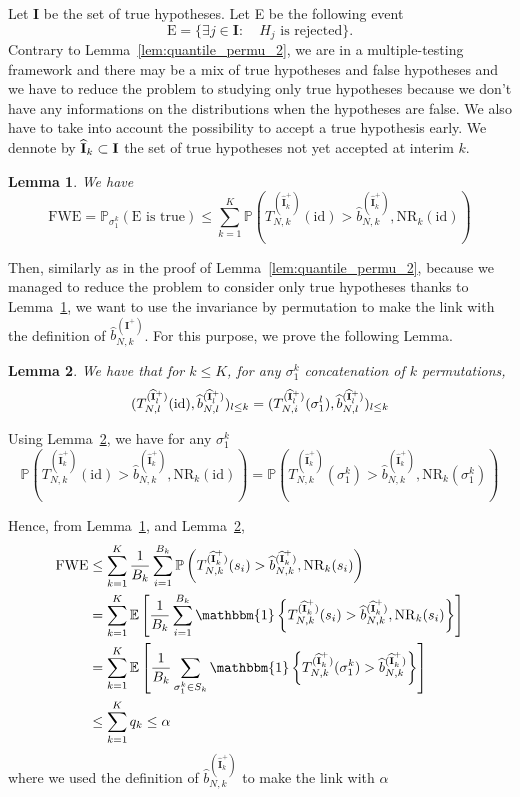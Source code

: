 \documentclass{article}
\theoremstyle{plain}
\newtheorem{Lemma}{Lemma}
\theoremstyle{remark}
\renewcommand{\P}{\mathbb{P}}
\newcommand{\E}{\mathbb{E}}
\newcommand{\1}{\mathbbm{1}}
\newcommand{\id}{\mathrm{id}}
\numberwithin{equation}{section}
\begin{document}
Let $\textbf{I}$ be the set of true hypotheses. Let E be the following event
$$\mathrm{E}= \{ \exists j \in \textbf{I}: \quad H_j \text{ is rejected}\}.$$
Contrary to Lemma~\ref{lem:quantile_permu_2}, we are in a multiple-testing framework and there may be a mix of true hypotheses and false hypotheses and we have to reduce the problem to studying only true hypotheses because we don't have any informations on the distributions when the hypotheses are false. We also have to take into account the possibility to accept a true hypothesis early. We dennote by $\widehat{\bf I}_k \subset \bf I$ the set of true hypotheses not yet accepted at interim $k$.
\begin{Lemma}\label{lem:multiple_test_FWE}
We have 
$$\mathrm{FWE} = \P_{\sigma_1^k}\left(\mathrm{E}\text{ is true} \right) \le \sum_{k=1}^K\P\left( T_{N,k}^{(\widehat{\textbf{I}}_k^+)}(\id) > \widehat{b}_{N,k}^{(\widehat{\textbf{I}}_k^+)}, \mathrm{NR}_k(\id)\right)  $$
\end{Lemma}
Then, similarly as in the proof of Lemma~\ref{lem:quantile_permu_2}, because we managed to reduce the problem to consider only true hypotheses thanks to Lemma~\ref{lem:multiple_test_FWE}, we want to use the invariance by permutation to make the link with the definition of $\widehat{b}_{N,k}^{(\textbf{I}^+)}$. For this purpose, we prove the following Lemma.


\begin{Lemma}\label{lem:invariance}
We have that for $k \le K$, for any ${\sigma_1^k}$ concatenation of $k$ permutations, 
$$(T_{N,l}^{(\widehat{\bf{I}}_l^+)}(\id),\widehat{b}_{N,l}^{(\widehat{\bf{I}}_l^+)})_{l\le k}=(T_{N,i}^{(\widehat{\bf{I}}_l^+)}(\sigma_1^l), \widehat{b}_{N,l}^{(\widehat{\bf{I}}_l^+)})_{l\le k}$$
\end{Lemma}
Using Lemma~\ref{lem:invariance}, we have for any ${\sigma_1^k}$
$$\P\left(T_{N,k}^{(\widehat{\textbf{I}}_k^+)}(\id) > \widehat{b}_{N,k}^{(\widehat{\textbf{I}}_k^+)}, \mathrm{NR}_k(\id ) \right) = \P\left(T_{N,k}^{(\widehat{\textbf{I}}_k^+)}({\sigma_1^k}) > \widehat{b}_{N,k}^{(\widehat{\textbf{I}}_k^+)}, \mathrm{NR}_k({\sigma_1^k}) \right)$$

Hence, from Lemma~\ref{lem:multiple_test_FWE}, and Lemma~\ref{lem:invariance},
\begin{align*}
\mathrm{FWE} &\le \sum_{k=1}^K\frac{1}{B_k}\sum_{i=1}^{B_k}\P\left(T_{N,k}^{(\widehat{\textbf{I}}_k^+)}(s_i) > \widehat{b}_{N,k}^{(\widehat{\textbf{I}}_k^+)}, \mathrm{NR}_k(s_i) \right)\\
&= \sum_{k=1}^K\E\left[\frac{1}{B_k}\sum_{i=1}^{B_k}\1\left\{ T_{N,k}^{(\widehat{\textbf{I}}_k^+)}(s_i) > \widehat{b}_{N,k}^{(\widehat{\textbf{I}}_k^+)}, \mathrm{NR}_k(s_i)\right\} \right]\\
&= \sum_{k=1}^K \E\left[\frac{1}{B_k}\sum_{{\sigma_1^k} \in S_k}\1\left\{ T_{N,k}^{(\widehat{\textbf{I}}_k^+)}({\sigma_1^k}) > \widehat{b}_{N,k}^{(\widehat{\textbf{I}}_k^+)}\right\} \right]\\
&\le \sum_{k=1}^K q_k \le \alpha
\end{align*}
where we used the definition of $\widehat{b}_{N,k}^{(\widehat{\textbf{I}}_k^+)}$ to make the link with $\alpha$
\end{document}
